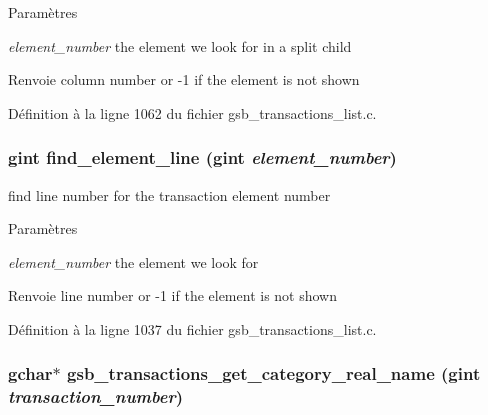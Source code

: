 \begin{DoxyParams}{Paramètres}
\item[{\em element\_\-number}]the element we look for in a split child\end{DoxyParams}
\begin{DoxyReturn}{Renvoie}
column number or -\/1 if the element is not shown 
\end{DoxyReturn}


Définition à la ligne 1062 du fichier gsb\_\-transactions\_\-list.c.

\subsubsection[{find\_\-element\_\-line}]{\setlength{\rightskip}{0pt plus 5cm}gint find\_\-element\_\-line (gint {\em element\_\-number})}\label{gsb__transactions__list_8c_a17bf5dcbc82415220a20244112d65aef}
find line number for the transaction element number


\begin{DoxyParams}{Paramètres}
\item[{\em element\_\-number}]the element we look for\end{DoxyParams}
\begin{DoxyReturn}{Renvoie}
line number or -\/1 if the element is not shown 
\end{DoxyReturn}


Définition à la ligne 1037 du fichier gsb\_\-transactions\_\-list.c.

\subsubsection[{gsb\_\-transactions\_\-get\_\-category\_\-real\_\-name}]{\setlength{\rightskip}{0pt plus 5cm}gchar$\ast$ gsb\_\-transactions\_\-get\_\-category\_\-real\_\-name (gint {\em transaction\_\-number})}\label{gsb__transactions__list_8c_a1144ff7dd8c9bf6a2a6eb870fc8ae2df}


